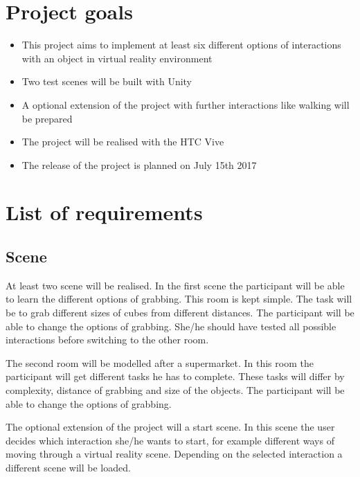 \documentclass[a4paper, 12pt]{article}
\newcommand{\changefont}[3]{
\fontfamily{#1} \fontseries{#2} \fontshape{#3} \selectfont}
\begin{document}

%


	\tableofcontents
	\newpage
    
\section{Project goals}

\begin{itemize}
\item This project aims to implement at least six different options of interactions with an object in virtual reality environment 
\item Two test scenes will be built with Unity
\item A optional extension of the project with further interactions like walking will be prepared
\item The project will be realised with the HTC Vive
\item The release of the project is planned on July 15th 2017
\end{itemize}

\section{List of requirements}
\subsection{Scene}
At least two scene will be realised. In the first scene the participant will be able to learn the different options of grabbing. This room is kept simple. The task will be to grab different sizes of cubes from different distances. The participant will be able to change the options of grabbing. She/he should have tested all possible interactions before switching to the other room.

The second room will be modelled after a supermarket. In this room the participant will get different tasks he has to complete. These tasks will differ by complexity, distance of grabbing and size of the objects. The participant will be able to change the options of grabbing.

The optional extension of the project will a start scene. In this scene the user decides which interaction she/he wants to start, for example different ways of moving through a virtual reality scene. Depending on the selected interaction a different scene will be loaded.
\end{document}
